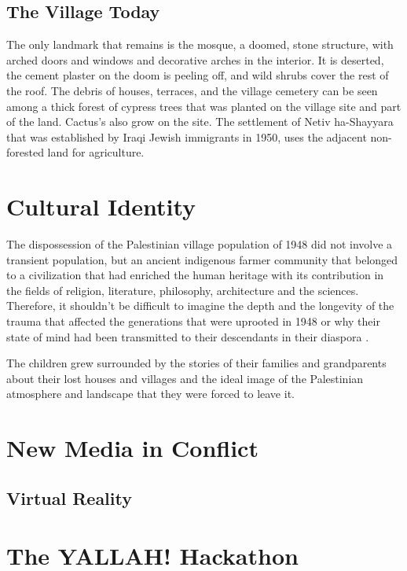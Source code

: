 \subsection{The Village Today}

The only landmark that remains is the mosque, a doomed, stone structure, with arched doors and windows and decorative arches in the interior. It is deserted, the cement plaster on the doom is peeling off, and wild shrubs cover the rest of the roof. The debris of houses, terraces, and the village cemetery can be seen among a thick forest of cypress trees that was planted on the village site and part of the land. Cactus's also grow on the site. The settlement of Netiv ha-Shayyara that was established by Iraqi Jewish immigrants in 1950, uses the adjacent non-forested land for agriculture.    


\section{Cultural Identity}
 
 The dispossession of the Palestinian village population of 1948 did not involve a transient population, but an ancient indigenous farmer community that belonged to a civilization that had enriched the human heritage with its contribution in the fields of religion, literature, philosophy, architecture and the sciences. Therefore, it shouldn't be difficult to imagine the depth and the longevity of the trauma that affected the generations that were uprooted in 1948 or why their state of mind had been transmitted to their descendants in their diaspora \citep{Khalidi2015}.
 
 The children grew surrounded by the stories of their families and grandparents about their lost houses and villages and the ideal image of the Palestinian atmosphere and landscape that they were forced to leave it\citep{Blachnicka-Ciacek2018}.  


\section{New Media in Conflict}

\subsection{Virtual Reality}



\section{The YALLAH! Hackathon}

